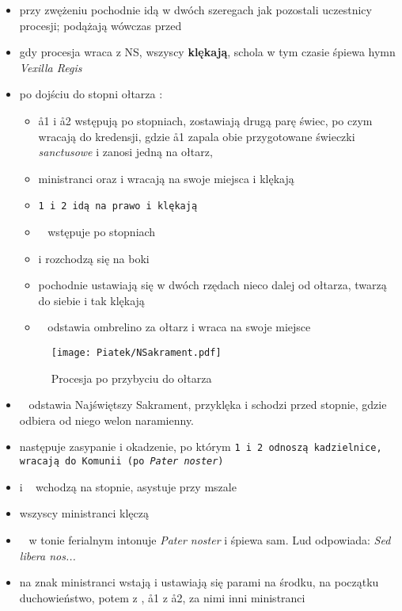 \begin{itemize}
      \item przy zwężeniu pochodnie idą w dwóch szeregach jak pozostali
            uczestnicy procesji; podążają wówczas przed \tt\tt
      \item gdy procesja wraca z NS, wszyscy \textbf{klękają}, schola w tym
            czasie śpiewa hymn \textit{Vexilla Regis}
      \item po dojściu do stopni ołtarza :
            \begin{itemize}
                  \item \aa1 i \aa2 wstępują po stopniach, zostawiają drugą parę
                        świec, po czym wracają do kredensji, gdzie \aa1 zapala
                        obie przygotowane świeczki \textit{sanctusowe} i zanosi
                        jedną na ołtarz,
                  \item ministranci oraz  i 
                        wracają na swoje miejsca i klękają
                  \item \tt1 i \tt2 idą na prawo i klękają
                  \item \ii~ wstępuje po stopniach
                  \item {} i  rozchodzą się na boki
                  \item pochodnie ustawiają się w dwóch rzędach nieco dalej od
                        ołtarza, twarzą do siebie i tak klękają
                  \item \oo~ odstawia ombrelino za ołtarz i wraca na swoje
                        miejsce
            \end{itemize}

            \begin{figure}[h]
                  \centering
                  \texttt{[image: Piatek/NSakrament.pdf]}
                  \caption{Procesja po przybyciu do ołtarza}
            \end{figure}

      \item \ii~ odstawia Najświętszy Sakrament, przyklęka i schodzi przed
            stopnie, gdzie  odbiera od niego welon naramienny.
      \item następuje zasypanie i okadzenie, po którym \tt1 i \tt2 odnoszą
            kadzielnice, wracają do Komunii (po \textit{Pater noster})
      \item {} i \ii~ wchodzą na stopnie,  asystuje przy mszale
      \item wszyscy ministranci klęczą
      \item \ii~ w tonie ferialnym intonuje \textit{Pater noster} i śpiewa sam.
            Lud odpowiada: \textit{Sed libera nos...}
      \item na znak  ministranci wstają i ustawiają się parami na środku, na
            początku duchowieństwo, potem  z , \aa1 z \aa2, za nimi inni
            ministranci


\end{itemize}
